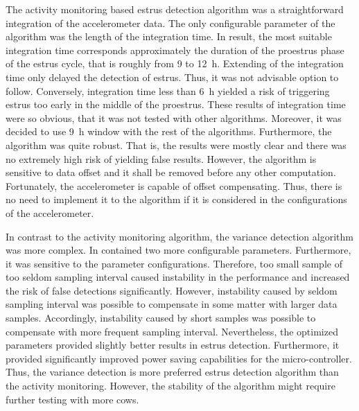 \documentclass[english,12pt,a4paper,pdftex,elec,utf8]{aaltothesis}
\begin{document}
The activity monitoring based estrus detection algorithm was a straightforward integration of the accelerometer data. The only configurable parameter of the algorithm was the length of the integration time. In result, the most suitable integration time corresponds approximately the duration of the proestrus phase of the estrus cycle, that is roughly from 9 to \SI{12}{\hour}. Extending of the integration time only delayed the detection of estrus. Thus, it was not advisable option to follow. Conversely, integration time less than \SI{6}{\hour} yielded a risk of triggering estrus too early in the middle of the proestrus. These results of integration time were so obvious, that it was not tested with other algorithms. Moreover, it was decided to use \SI{9}{\hour} window with the rest of the algorithms. Furthermore, the algorithm was quite robust. That is, the results were mostly clear and there was no extremely high risk of yielding false results. However, the algorithm is sensitive to data offset and it shall be removed before any other computation. Fortunately, the accelerometer is capable of offset compensating. Thus, there is no need to implement it to the algorithm if it is considered in the configurations of the accelerometer.

In contrast to the activity monitoring algorithm, the variance detection algorithm was more complex. In contained two more configurable parameters. Furthermore, it was sensitive to the parameter configurations. Therefore, too small sample of too seldom sampling interval caused instability in the performance and increased the risk of false detections significantly. However, instability caused by seldom sampling interval was  possible to compensate in some matter with larger data samples. Accordingly, instability caused by short samples was possible to compensate with more frequent sampling interval. Nevertheless, the optimized parameters provided slightly better results in estrus detection. Furthermore, it provided significantly improved power saving capabilities for the micro-controller. Thus, the variance detection is more preferred estrus detection algorithm than the activity monitoring. However, the stability of the algorithm might require further testing with more cows.
\end{document}
